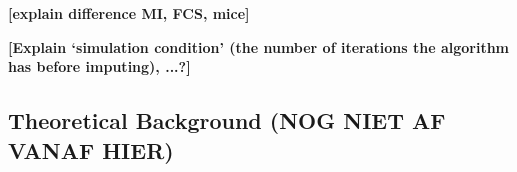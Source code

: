 \documentclass[article]{jss}
\begin{document}
\textbf{[explain difference MI, FCS, mice]}

\textbf{[Explain `simulation condition' (the number of iterations the algorithm has before imputing), ...?]}





% 
% 

\subsection{Theoretical Background (NOG NIET AF VANAF HIER)} \label{sec:background}
\end{document}
